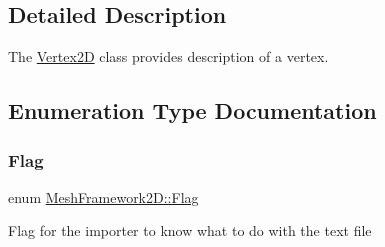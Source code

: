 \subsection{Detailed Description}
The \hyperlink{classMeshFramework2D_1_1Vertex2D}{Vertex2D} class provides description of a vertex. 

\subsection{Enumeration Type Documentation}
\mbox{\label{namespaceMeshFramework2D_ace0d6501a2c8c59dad381aa35f1f4ed4}} 
\subsubsection{\texorpdfstring{Flag}{Flag}}
{\footnotesize\ttfamily enum \hyperlink{namespaceMeshFramework2D_ace0d6501a2c8c59dad381aa35f1f4ed4}{Mesh\+Framework2\+D\+::\+Flag}}

Flag for the importer to know what to do with the text file 
